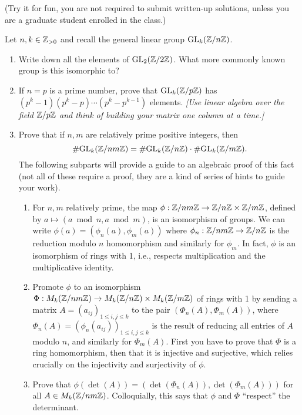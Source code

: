 
 (Try it for fun, you are not
required to submit written-up solutions, unless you are a graduate
student enrolled in the class.)

\begin{problem}
Let $n,k \in \mathbb{Z}_{>0}$ and recall the general linear group $\mathrm{GL}_k(\mathbb{Z}/n\mathbb{Z})$.
\begin{enumerate}\setlength{\itemsep}{3mm}
\item Write down all the elements of $\mathrm{GL}_2(\mathbb{Z}/2\mathbb{Z})$.  What more
commonly known group is this isomorphic to?

\item If $n=p$ is a prime number, prove that $\mathrm{GL}_k(\mathbb{Z}/p\mathbb{Z})$ has
$(p^k-1)(p^k-p)\dotsm (p^k-p^{k-1})$ elements.  \emph{[Use linear
algebra over the field $\mathbb{Z}/p\mathbb{Z}$ and think of building your matrix one
column at a time.]}

\item Prove that if $n,m$ are relatively prime positive integers, then
\[
\# \mathrm{GL}_k(\mathbb{Z}/nm\mathbb{Z}) = \# \mathrm{GL}_k(\mathbb{Z}/n\mathbb{Z}) \cdot \# \mathrm{GL}_k(\mathbb{Z}/m\mathbb{Z}).  
\]
The following subparts will provide a guide to an algebraic proof of
this fact (not all of these require a proof, they are a kind of series
of hints to guide your work).

\begin{enumerate}\setlength{\itemsep}{3mm}
\item For $n,m$ relatively prime, the map $\phi : \mathbb{Z}/nm\mathbb{Z} \to \mathbb{Z}/n\mathbb{Z}
\times \mathbb{Z}/m\mathbb{Z}$, defined by $a \mapsto (a \bmod n, a \bmod m)$, is an
isomorphism of groups.  We can
write $\phi(a) = (\phi_n(a),\phi_m(a))$ where $\phi_n : \mathbb{Z}/nm\mathbb{Z} \to
\mathbb{Z}/n\mathbb{Z}$ is the reduction modulo $n$ homomorphism and similarly for
$\phi_m$.  In fact, $\phi$ is an isomorphism of rings with 1, i.e.,
respects multiplication and the multiplicative identity.

\item Promote $\phi$ to an isomorphism $\Phi : M_k(\mathbb{Z}/nm\mathbb{Z}) \to
M_k(\mathbb{Z}/n\mathbb{Z}) \times M_k(\mathbb{Z}/m\mathbb{Z})$ of rings with 1 by sending a
matrix $A = (a_{ij})_{1 \leq i,j \leq k}$ to the
pair $(\Phi_n(A), \Phi_m(A))$, where $\Phi_n(A) =
(\phi_n(a_{ij}))_{1\leq i,j\leq k}$ is the result of reducing all
entries of $A$ modulo $n$, and similarly for $\Phi_m(A)$.  First
you have to prove that $\Phi$ is a ring homomorphism, then that it
is injective and surjective, which relies crucially on the
injectivity and surjectivity of $\phi$.

\item Prove that $\phi(\det(A)) = (\det(\Phi_n(A)), \det(\Phi_m(A)))$
for all $A \in M_k(\mathbb{Z}/nm\mathbb{Z})$. Colloquially, this says that
$\phi$ and $\Phi$ ``respect'' the determinant.


\end{enumerate}
\end{enumerate}
\end{problem}

